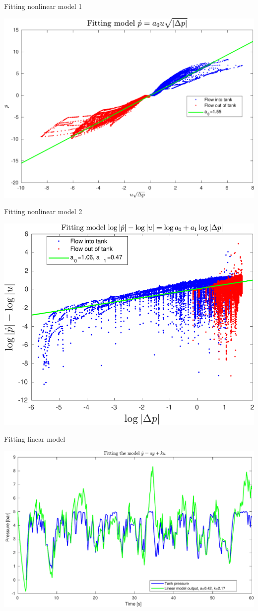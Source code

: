 \documentclass[presentation,aspectratio=1610]{beamer}
\begin{document}
\begin{frame}[label={sec:orgd55b88c}]{Fitting nonlinear model 1}
\begin{center}
\includegraphics[width=0.9\linewidth]{../../figures/tank-sysid-sqrt-deltaP}
\end{center}
\end{frame}

\begin{frame}[label={sec:orgc3a7756}]{Fitting nonlinear model 2}
\begin{center}
\includegraphics[width=0.8\linewidth]{../../figures/tank-sysid-log}
\end{center}
\end{frame}

\begin{frame}[label={sec:org54e1900}]{Fitting linear model}
\begin{center}
\includegraphics[width=0.8\linewidth]{../../figures/tank-sysid-linear-model}
\end{center}
\end{frame}
\end{document}
